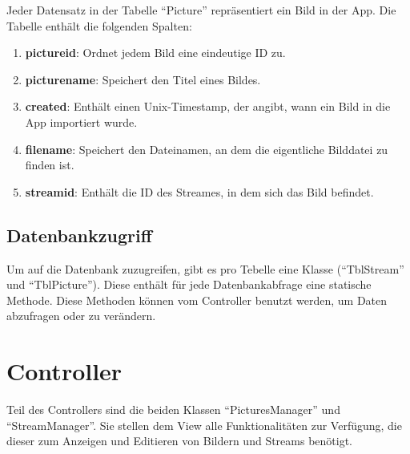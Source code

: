 Jeder Datensatz in der Tabelle \enquote{Picture} repräsentiert ein Bild in der App. Die Tabelle enthält die folgenden Spalten:
\begin{enumerate}
	\item \textbf{pictureid}: Ordnet jedem Bild eine eindeutige ID zu.
	\item \textbf{picturename}: Speichert den Titel eines Bildes.
	\item \textbf{created}: Enthält einen Unix-Timestamp, der angibt, wann ein Bild in die App importiert wurde.
	\item \textbf{filename}: Speichert den Dateinamen, an dem die eigentliche Bilddatei zu finden ist.
	\item \textbf{streamid}: Enthält die ID des Streames, in dem sich das Bild befindet.
\end{enumerate}

\subsection{Datenbankzugriff}
Um auf die Datenbank zuzugreifen, gibt es pro Tebelle eine Klasse (\enquote{TblStream} und \enquote{TblPicture}). Diese enthält für jede Datenbankabfrage eine statische Methode. Diese Methoden können vom Controller benutzt werden, um Daten abzufragen oder zu verändern.

\section{Controller}

Teil des Controllers sind die beiden Klassen \enquote{PicturesManager} und \enquote{StreamManager}. Sie stellen dem View alle Funktionalitäten zur Verfügung, die dieser zum Anzeigen und Editieren von Bildern und Streams benötigt.

